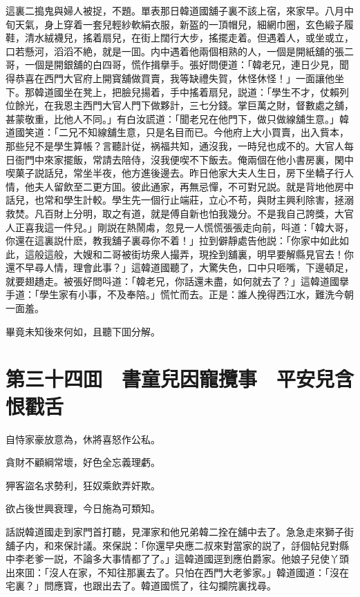 這裏二搗鬼與婦人被捉，不題。單表那日韓道國舖子裏不該上宿，來家早。八月中旬天氣，身上穿着一套兒輕紗軟絹衣服，新盔的一頂帽兒，細網巾圈，玄色緞子履鞋，清水絨襪兒，搖着扇兒，在街上闊行大步，搖擺走着。但遇着人，或坐或立，口若懸河，滔滔不絶，就是一囬。内中遇着他兩個相熟的人，一個是開紙舖的張二哥，一個是開銀舖的白四哥，慌作揖擧手。張好問便道：「韓老兄，連日少見，聞得恭喜在西門大官府上開寳舖做買賣，我等缺禮失賀，休怪休怪！」一面讓他坐下。那韓道國坐在凳上，把臉兒揚着，手中搖着扇兒，説道：「學生不才，仗賴列位餘光，在我恩主西門大官人門下做夥計，三七分錢。掌巨萬之財，督數處之舖，甚蒙敬重，比他人不同。」有白汝謊道：「聞老兄在他門下，做只做線舖生意。」韓道國笑道：「二兄不知線舖生意，只是名目而已。今他府上大小買賣，出入貲本，那些兒不是學生算帳？言聽計従，祸福共知，通沒我，一時兒也成不的。大官人每日衙門中來家擺飯，常請去陪侍，沒我便喫不下飯去。俺兩個在他小書房裏，閑中喫菓子説話兒，常坐半夜，他方進後邊去。昨日他家大夫人生日，房下坐轎子行人情，他夫人留飲至二更方囬。彼此通家，再無忌憚，不可對兄説。就是背地他房中話兒，也常和學生計較。學生先一個行止端莊，立心不苟，與財主興利除害，拯溺救焚。凡百財上分明，取之有道，就是傅自新也怕我幾分。不是我自己誇獎，大官人正喜我這一件兒。」剛説在熱鬧䖏，忽見一人慌慌張張走向前，呌道：「韓大哥，你還在這裏説什麽，教我舖子裏尋你不着！」拉到僻靜處告他説：「你家中如此如此，這般這般，大嫂和二哥被街坊衆人撮弄，現拴到舖裏，明早要解縣見官去！你還不早尋人情，理會此事？」這韓道國聽了，大驚失色，口中只咂嘴，下邊頓足，就要翅趫走。被張好問呌道：「韓老兄，你話還未盡，如何就去了？」這韓道國擧手道：「學生家有小事，不及奉陪。」慌忙而去。正是：誰人挽得西江水，難洗今朝一面羞。

畢竟未知後來何如，且聽下囬分解。

\chapter*{第三十四囬　書童兒因寵攬事　平安兒含恨戳舌}

自恃家豪放意為，休將喜怒作公私。

貪財不顧綱常壞，好色全忘義理虧。

狎客盜名求勢利，狂奴乘飲弄奸欺。

欲占後世興衰理，今日施為可類知。

話説韓道國走到家門首打聽，見渾家和他兄弟韓二拴在舖中去了。急急走來獅子街舖子内，和來保計議。來保説：「你還早央應二叔來對當家的説了，㧱個帖兒對縣中李老爹一説，不論多大事情都了了。」這韓道國逕到應伯爵家。他娘子兒使丫頭出來囬：「沒人在家，不知往那裏去了。只怕在西門大老爹家。」韓道國道：「沒在宅裏？」問應寳，也跟出去了。韓道國慌了，往勾攔院裏找尋。

